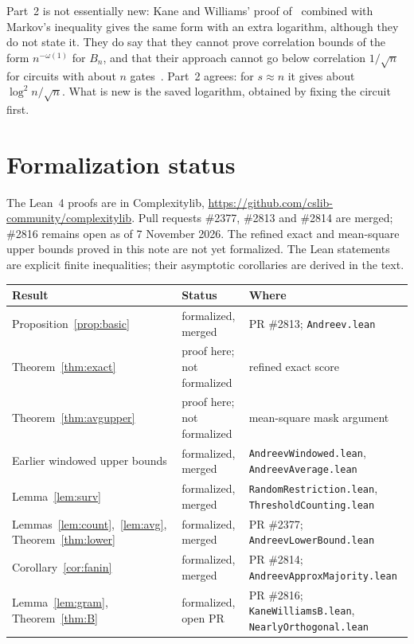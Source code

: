 \documentclass[11pt,letterpaper]{article}
\theoremstyle{remark}
\newcommand{\sect}[1]{\section{\texorpdfstring{\color{ink}#1}{#1}}}
\begin{document}
Part~2 is not essentially new: Kane and Williams' proof
of~\cite[Cor.~6.2]{KW} combined with Markov's inequality gives the same form
with an extra logarithm, although they do not state it. They do say that they
cannot prove correlation bounds of the form $n^{-\omega(1)}$ for $B_n$, and
that their approach cannot go below correlation $1/\sqrt n$ for circuits with
about $n$ gates~\cite[Section~6]{KW}. Part~2 agrees: for $s\approx n$ it
gives about $\log^2n/\sqrt n$. What is new is the saved logarithm, obtained
by fixing the circuit first.

\sect{Formalization status}\label{sec:lean}

The Lean~4 proofs are in Complexitylib,
\url{https://github.com/cslib-community/complexitylib}. Pull requests
\#2377, \#2813 and \#2814 are merged; \#2816 remains open as of
7 November 2026. The refined exact and mean-square upper bounds proved in
this note are not yet formalized. The Lean statements are explicit finite
inequalities; their asymptotic corollaries are derived in the text.

\begin{center}
\small
\renewcommand{\arraystretch}{1.2}
\begin{tabular}{@{}P{0.30\textwidth}P{0.23\textwidth}P{0.40\textwidth}@{}}
\toprule
Result & Status & Where\\
\midrule
Proposition~\ref{prop:basic} & formalized, merged & PR \#2813; \texttt{Andreev.lean}\\
Theorem~\ref{thm:exact} & proof here; not formalized & refined exact score\\
Theorem~\ref{thm:avgupper} & proof here; not formalized & mean-square mask argument\\
Earlier windowed upper bounds & formalized, merged & \texttt{AndreevWindowed.lean}, \texttt{AndreevAverage.lean}\\
Lemma~\ref{lem:surv} & formalized, merged & \texttt{RandomRestriction.lean}, \texttt{ThresholdCounting.lean}\\
Lemmas~\ref{lem:count},~\ref{lem:avg}, Theorem~\ref{thm:lower} & formalized, merged & PR \#2377; \texttt{AndreevLowerBound.lean}\\
Corollary~\ref{cor:fanin} & formalized, merged & PR \#2814; \texttt{AndreevApproxMajority.lean}\\
Lemma~\ref{lem:gram}, Theorem~\ref{thm:B} & formalized, open PR & PR \#2816; \texttt{KaneWilliamsB.lean}, \texttt{NearlyOrthogonal.lean}\\
\bottomrule
\end{tabular}
\end{center}
\end{document}
